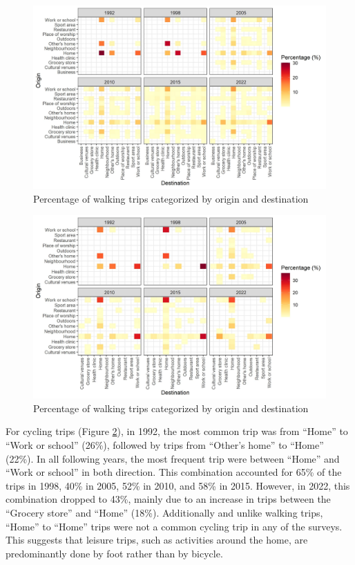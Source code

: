 \documentclass[preprint, 3p,
authoryear]{elsarticle} %
\begin{document}
\begin{figure}
\includegraphics[width=1\linewidth]{figures/walking_hm_fig} \caption{Percentage of walking trips categorized by origin and destination}\label{fig:walking-heatmap}
\end{figure}

\begin{figure}
\includegraphics[width=1\linewidth]{figures/cycling_hm_fig} \caption{Percentage of walking trips categorized by origin and destination}\label{fig:cycling-heatmap}
\end{figure}

For cycling trips (Figure \ref{fig:cycling-heatmap}), in 1992, the most
common trip was from ``Home'' to ``Work or school'' (26\%), followed by
trips from ``Other's home'' to ``Home'' (22\%). In all following years,
the most frequent trip were between ``Home'' and ``Work or school'' in
both direction. This combination accounted for 65\% of the trips in
1998, 40\% in 2005, 52\% in 2010, and 58\% in 2015. However, in 2022,
this combination dropped to 43\%, mainly due to an increase in trips
between the ``Grocery store'' and ``Home'' (18\%). Additionally and
unlike walking trips, ``Home'' to ``Home'' trips were not a common
cycling trip in any of the surveys. This suggests that leisure trips,
such as activities around the home, are predominantly done by foot
rather than by bicycle.
\end{document}
